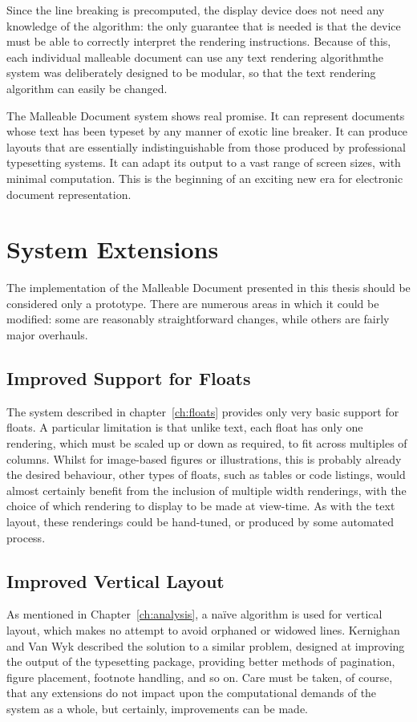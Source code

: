 Since the line breaking is precomputed, the display device does not need any knowledge of the algorithm: the only guarantee that is needed is that the device must be able to correctly interpret the rendering instructions. Because of this, each individual malleable document can use any text rendering algorithm\ed the system was deliberately designed to be modular, so that the text rendering algorithm can easily be changed.

The Malleable Document system shows real promise. It can represent documents whose text has been typeset by any manner of exotic line breaker. It can produce layouts that are essentially indistinguishable from those produced by professional typesetting systems. It can adapt its output to a vast range of screen sizes, with minimal computation. This is the beginning of an exciting new era for electronic document representation.


\section{System Extensions}
The implementation of the Malleable Document presented in this thesis should be considered only a prototype. There are numerous areas in which it could be modified: some are reasonably straightforward changes, while others are fairly major overhauls.


\subsection{Improved Support for Floats}
The system described in chapter~\ref{ch:floats} provides only very basic support for floats. A particular limitation is that unlike text, each float has only one rendering, which must be scaled up or down as required, to fit across multiples of columns. Whilst for image-based figures or illustrations, this is probably already the desired behaviour, other types of floats, such as tables or code listings, would almost certainly benefit from the inclusion of multiple width renderings, with the choice of which rendering to display to be made at view-time. As with the text layout, these renderings could be hand-tuned, or produced by some automated process. 

\subsection{Improved Vertical Layout}
As mentioned in Chapter~\ref{ch:analysis}, a na\"ive algorithm is used for vertical layout, which makes no attempt to avoid orphaned or widowed lines. Kernighan and Van Wyk\hspace{0pt}\cite{Kernighan1989} described the solution to a similar problem, designed at improving the output of the \troff{} typesetting package, providing better methods of pagination, figure placement, footnote handling, and so on. Care must be taken, of course, that any extensions do not impact upon the computational demands of the system as a whole, but certainly, improvements can be made.


